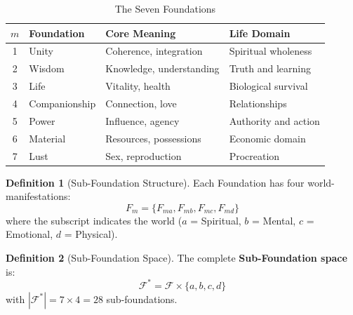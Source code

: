 \documentclass[11pt,twoside,openright]{book}
\theoremstyle{definition}
\newtheorem{definition}{Definition}[chapter]
\theoremstyle{plain}
\theoremstyle{remark}
\newcommand{\Foundations}{\mathcal{F}}
\begin{document}
\begin{table}[h]
\centering
\caption{The Seven Foundations}
\label{tab:foundations}
\begin{tabular}{clll}
\toprule
$m$ & \textbf{Foundation} & \textbf{Core Meaning} & \textbf{Life Domain} \\
\midrule
1 & Unity & Coherence, integration & Spiritual wholeness \\
2 & Wisdom & Knowledge, understanding & Truth and learning \\
3 & Life & Vitality, health & Biological survival \\
4 & Companionship & Connection, love & Relationships \\
5 & Power & Influence, agency & Authority and action \\
6 & Material & Resources, possessions & Economic domain \\
7 & Lust & Sex, reproduction & Procreation \\
\bottomrule
\end{tabular}
\end{table}

\begin{definition}[Sub-Foundation Structure]
\label{def:subfoundation}
Each Foundation has four world-manifestations:
\[
F_m = \{F_{ma}, F_{mb}, F_{mc}, F_{md}\}
\]
where the subscript indicates the world ($a$ = Spiritual, $b$ = Mental, $c$ = Emotional, $d$ = Physical).
\end{definition}

\begin{definition}[Sub-Foundation Space]
\label{def:subfoundation-space}
The complete \textbf{Sub-Foundation space} is:
\[
\Foundations^* = \Foundations \times \{a, b, c, d\}
\]
with $|\Foundations^*| = 7 \times 4 = 28$ sub-foundations.
\end{definition}

\end{document}
